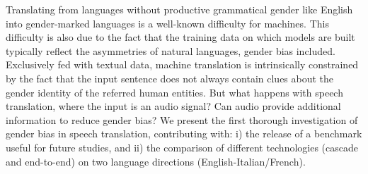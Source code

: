 Translating from languages without productive grammatical gender like English into gender-marked languages is  a well-known difficulty for machines. This difficulty is also due to the fact that the training data on which models are built typically reflect the asymmetries of natural languages, gender bias included. Exclusively fed with textual data, machine translation is intrinsically constrained by the fact that the input sentence does not always contain clues about the gender identity of the referred human entities. But what happens with speech translation, where the input is an audio signal? Can audio provide additional information to reduce gender bias? We present the first thorough investigation of gender bias in speech translation, contributing with: i) the release of a benchmark useful for future studies, and ii) the comparison of different technologies (cascade and end-to-end) on two language directions (English-Italian/French).
